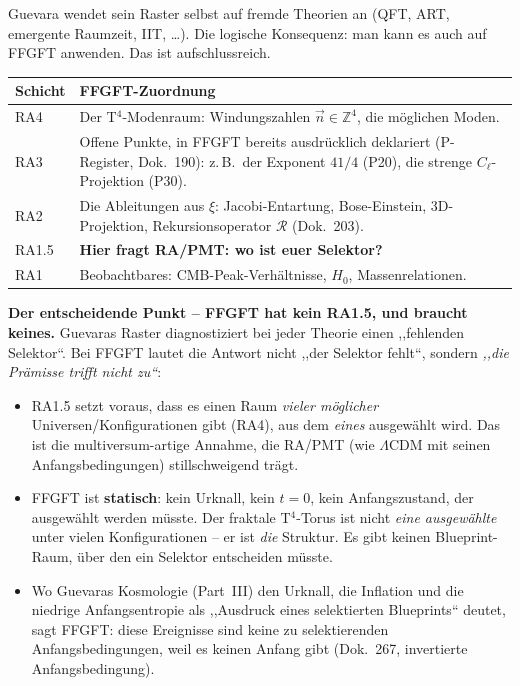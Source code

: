 Guevara wendet sein Raster selbst auf fremde Theorien an (QFT, ART,
emergente Raumzeit, IIT, \ldots). Die logische Konsequenz: man kann es
auch auf FFGFT anwenden. Das ist aufschlussreich.

\begin{center}
\begin{tabular}{p{2.2cm}p{9.5cm}}
\toprule
\textbf{Schicht} & \textbf{FFGFT-Zuordnung} \\
\midrule
RA4 & Der T$^4$-Modenraum: Windungszahlen $\vec{n}\in\mathbb{Z}^4$,
      die möglichen Moden. \\
\addlinespace
RA3 & Offene Punkte, in FFGFT bereits ausdrücklich deklariert
      (P-Register, Dok.~190): z.\,B.\ der Exponent $41/4$ (P20),
      die strenge $C_\ell$-Projektion (P30). \\
\addlinespace
RA2 & Die Ableitungen aus $\xi$: Jacobi-Entartung, Bose-Einstein,
      3D-Projektion, Rekursionsoperator $\mathcal{R}$ (Dok.~203). \\
\addlinespace
RA1.5 & \textbf{Hier fragt RA/PMT: wo ist euer Selektor?} \\
\addlinespace
RA1 & Beobachtbares: CMB-Peak-Verhältnisse, $H_0$, Massenrelationen. \\
\bottomrule
\end{tabular}
\end{center}

\textbf{Der entscheidende Punkt -- FFGFT hat kein RA1.5, und braucht
keines.} Guevaras Raster diagnostiziert bei jeder Theorie einen
,,fehlenden Selektor``. Bei FFGFT lautet die Antwort nicht ,,der
Selektor fehlt``, sondern \emph{,,die Prämisse trifft nicht zu``}:

\begin{itemize}
  \item RA1.5 setzt voraus, dass es einen Raum \emph{vieler möglicher}
        Universen/Konfigurationen gibt (RA4), aus dem \emph{eines}
        ausgewählt wird. Das ist die multiversum-artige Annahme, die
        RA/PMT (wie $\Lambda$CDM mit seinen Anfangsbedingungen)
        stillschweigend trägt.
  \item FFGFT ist \textbf{statisch}: kein Urknall, kein $t=0$, kein
        Anfangszustand, der ausgewählt werden müsste. Der fraktale
        T$^4$-Torus ist nicht \emph{eine ausgewählte} unter vielen
        Konfigurationen -- er ist \emph{die} Struktur. Es gibt keinen
        Blueprint-Raum, über den ein Selektor entscheiden müsste.
  \item Wo Guevaras Kosmologie (Part~III) den Urknall, die Inflation
        und die niedrige Anfangsentropie als ,,Ausdruck eines
        selektierten Blueprints`` deutet, sagt FFGFT: diese Ereignisse
        sind keine zu selektierenden Anfangsbedingungen, weil es keinen
        Anfang gibt (Dok.~267, invertierte Anfangsbedingung).
\end{itemize}

